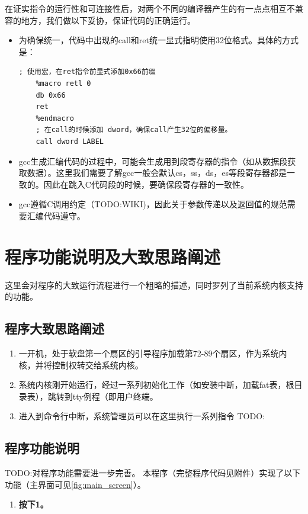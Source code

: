 \documentclass[forprint]{WHUBachelor}
\begin{document}
在证实指令的运行性和可连接性后，对两个不同的编译器产生的有一点点相互不兼容的地方，我们做以下妥协，保证代码的正确运行。

\begin{itemize}
  \item 为确保统一，代码中出现的call和ret统一显式指明使用32位格式。具体的方式是：
  \begin{lstlisting}[language={[x86masm]Assembler}]
    ; 使用宏，在ret指令前显式添加0x66前缀
    %macro retl 0
    db 0x66
    ret
    %endmacro
    ; 在call的时候添加 dword，确保call产生32位的偏移量。
    call dword LABEL
  \end{lstlisting}

  \item gcc生成汇编代码的过程中，可能会生成用到段寄存器的指令（如从数据段获取数据）。这里我们需要了解gcc一般会默认cs，ss，ds，es等段寄存器都是一致的。因此在跳入C代码段的时候，要确保段寄存器的一致性。

  \item gcc遵循C调用约定（TODO:WIKI)，因此关于参数传递以及返回值的规范需要汇编代码遵守。
  
\end{itemize}

\section{程序功能说明及大致思路阐述}

这里会对程序的大致运行流程进行一个粗略的描述，同时罗列了当前系统内核支持的功能。

\subsection{程序大致思路阐述}

\begin{enumerate}
  \item 一开机，处于软盘第一个扇区的引导程序加载第72-89个扇区，作为系统内核，并将控制权转交给系统内核。
  \item 系统内核刚开始运行，经过一系列初始化工作（如安装中断，加载fat表，根目录表），跳转到tty例程（即用户终端。
  \item 进入到命令行中断，系统管理员可以在这里执行一系列指令 TODO:
\end{enumerate}

\subsection{程序功能说明}
TODO:对程序功能需要进一步完善。
本程序（完整程序代码见附件）实现了以下功能（主界面可见\autoref{fig:main_screen}）。
\begin{enumerate}
  \item \textbf{按下1。}
\end{enumerate}
\end{document}
